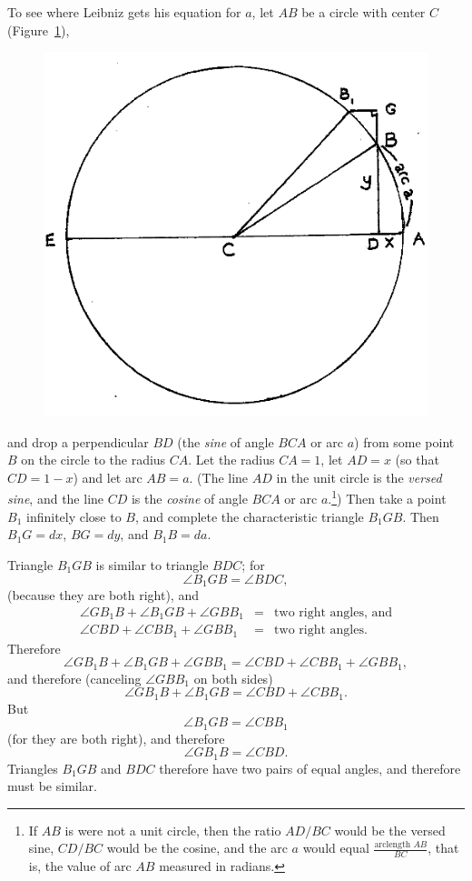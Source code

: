 \documentclass[polutonikogreek,english,twoside,openright]{article}
\begin{document}
To see where Leibniz gets his equation for $a$, let $AB$ be a circle with center $C$ (Figure~\ref{circarc}),
\begin{figure}[htp]
\begin{center}
\includegraphics[width=.65\textwidth]{fig/Figure42}
\caption{}
\label{circarc}
\vspace{-10pt}
\end{center}
\end{figure} 
and drop a perpendicular $BD$ (the {\em sine} of angle $BCA$ or arc
$a$) from some point $B$ on the circle to the radius $CA$.  Let the
radius $CA=1$, let $AD = x$ (so that $CD = 1-x$) and let arc $AB = a$.
(The line $AD$ in the unit circle is the {\em versed sine}, and the
line $CD$ is the {\em cosine} of angle $BCA$ or arc $a$.\footnote{If
  $AB$ is were not a unit circle, then the ratio $AD/BC$ would be the
  versed sine, $CD/BC$ would be the cosine, and the arc $a$ would
  equal $\displaystyle \frac{\text{arclength }AB}{BC}$, that is, the
  value of arc $AB$ measured in radians.}) Then take a point $B_1$
infinitely close to $B$, and complete the characteristic triangle
$B_1GB$.  Then $B_1G=dx$,\label{b1gpositive} $BG = dy$, and
$B_1B = da$.

Triangle $B_1GB$ is similar to triangle $BDC$; for 
$$\angle B_1GB = \angle BDC,$$
(because they are both right), and
\begin{eqnarray*}
\angle GB_1B + \angle B_1GB + \angle GBB_1 & = & \mbox{two right angles, and}\\
\angle CBD + \angle CBB_1 + \angle GBB_1 & = & \mbox{two right angles.}
\end{eqnarray*}
Therefore 
$$\angle GB_1B + \angle B_1GB + \angle GBB_1 = \angle CBD + \angle CBB_1 + \angle GBB_1, $$
and therefore (canceling $\angle GBB_1$ on both sides)
$$\angle GB_1B + \angle B_1GB  = \angle CBD + \angle CBB_1. $$
But 
$$\angle B_1GB = \angle CBB_1$$
(for they are both right), and therefore
$$\angle GB_1B = \angle CBD.$$
Triangles $B_1GB$ and $BDC$ therefore have two pairs of equal angles, and therefore must be similar.
\end{document}
